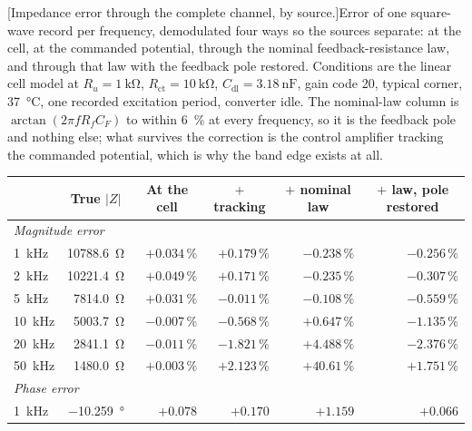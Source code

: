 \noindent\parbox[b]{\textwidth}{%
  [{Impedance error through the complete channel, by source.}]{Error
  of one square-wave record per frequency, demodulated four ways so the sources
  separate: at the cell, at the commanded potential, through the nominal
  feedback-resistance law, and through that law with the feedback pole
  restored. Conditions are the linear cell model at
  \(R_u = \SI{1}{\kilo\ohm}\), \(R_{\mathrm{ct}} = \SI{10}{\kilo\ohm}\),
  \(C_{\mathrm{dl}} = \SI{3.18}{\nano\farad}\), gain code 20, typical corner,
  \SI{37}{\celsius}, one recorded excitation period, converter idle. The
  nominal-law column is \(\arctan(2\pi f R_f C_F)\) to within \SI{6}{\percent}
  at every frequency, so it is the feedback pole and nothing else; what
  survives the correction is the control amplifier tracking the commanded
  potential, which is why the band edge exists at all.}%
  \label{tab:eis-pixel}%
  \par\nobreak
  \centering
  \begin{tabular}{lrrrrr}
    \toprule
    & \multicolumn{1}{c}{True \(|Z|\)}
    & \multicolumn{1}{c}{At the cell}
    & \multicolumn{1}{c}{\(+\) tracking}
    & \multicolumn{1}{c}{\(+\) nominal law}
    & \multicolumn{1}{c}{\(+\) law, pole restored} \\
    \midrule
    \multicolumn{6}{l}{\emph{Magnitude error}} \\
    \SI{1}{\kilo\hertz}  & \SI{10788.6}{\ohm} & \(+0.034\,\%\) & \(+0.179\,\%\) & \(-0.238\,\%\) & \(-0.256\,\%\) \\
    \SI{2}{\kilo\hertz}  & \SI{10221.4}{\ohm} & \(+0.049\,\%\) & \(+0.171\,\%\) & \(-0.235\,\%\) & \(-0.307\,\%\) \\
    \SI{5}{\kilo\hertz}  & \SI{7814.0}{\ohm}  & \(+0.031\,\%\) & \(-0.011\,\%\) & \(-0.108\,\%\) & \(-0.559\,\%\) \\
    \SI{10}{\kilo\hertz} & \SI{5003.7}{\ohm}  & \(-0.007\,\%\) & \(-0.568\,\%\) & \(+0.647\,\%\) & \(-1.135\,\%\) \\
    \SI{20}{\kilo\hertz} & \SI{2841.1}{\ohm}  & \(-0.011\,\%\) & \(-1.821\,\%\) & \(+4.488\,\%\) & \(-2.376\,\%\) \\
    \SI{50}{\kilo\hertz} & \SI{1480.0}{\ohm}  & \(+0.003\,\%\) & \(+2.123\,\%\) & \(+40.61\,\%\)  & \(+1.751\,\%\) \\
    \midrule
    \multicolumn{6}{l}{\emph{Phase error}} \\
    \SI{1}{\kilo\hertz}  & \SI{-10.259}{\degree} & \(+0.078\) & \(+0.170\) & \(+1.159\) & \(+0.066\) \\

\end{tabular}}
